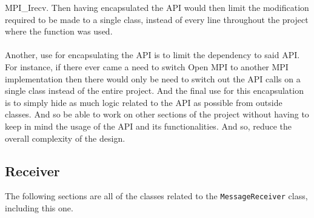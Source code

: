 \documentclass[11pt]{article}
\begin{document}
MPI\_Irecv. Then having encapsulated the API would then limit the modification
required to be made to a single class, instead of every line throughout the
project where the function was used.\\\\ Another, use for encapsulating
the API is to limit the dependency to said API. For instance, if there ever came
a need to switch Open MPI to another MPI implementation then there would only be
need to switch out the API calls on a single class instead of the entire
project. And the final use for this encapsulation is to simply hide as much
logic related to the API as possible from outside classes. And so be able to
work on other sections of the project without having to keep in mind the usage
of the API and its functionalities. And so, reduce the overall complexity of the
design.
\subsection{Receiver}
The following sections are all of the classes related to the
\texttt{MessageReceiver} class, including this one.
\end{document}
